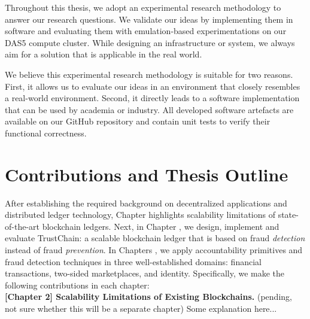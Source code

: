 Throughout this thesis, we adopt an experimental research methodology to answer our research questions.
We validate our ideas by implementing them in software and evaluating them with emulation-based experimentations on our DAS5 compute cluster.
While designing an infrastructure or system, we always aim for a solution that is applicable in the real world.

We believe this experimental research methodology is suitable for two reasons.
First, it allows us to evaluate our ideas in an environment that closely resembles a real-world environment.
Second, it directly leads to a software implementation that can be used by academia or industry.
All developed software artefacts are available on our GitHub repository and contain unit tests to verify their functional correctness.



\section{Contributions and Thesis Outline}

After establishing the required background on decentralized applications and distributed ledger technology, Chapter  highlights scalability limitations of state-of-the-art blockchain ledgers.
Next, in Chapter , we design, implement and evaluate TrustChain: a scalable blockchain ledger that is based on fraud \emph{detection} instead of fraud \emph{prevention}.
In Chapters , we apply accountability primitives and fraud detection techniques in three well-established domains: financial transactions, two-sided marketplaces, and identity.
Specifically, we make the following contributions in each chapter:\\

\textbf{[Chapter 2] Scalability Limitations of Existing Blockchains.} (pending, not sure whether this will be a separate chapter)
Some explanation here...\\

